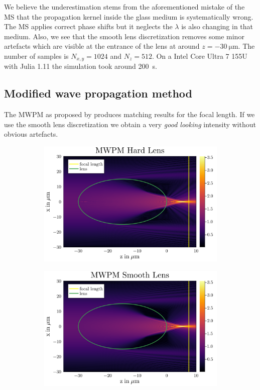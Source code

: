 \documentclass[a4paper,12pt]{article}
\begin{document}
We believe the underestimation stems from the aforementioned mistake of the MS that the propagation kernel inside the glass medium is systematically wrong. The MS applies correct phase shifts but it neglects the $\lambda$ is also changing in that medium.
Also, we see that the smooth lens discretization removes some minor artefacts which are visible at the entrance of the lens at around $z=\SI{-30}{\micro\meter}$.
The number of samples is $N_{x,y} = 1024$ and $N_z=512$. On a Intel Core Ultra 7 155U with Julia 1.11 the simulation took around \SI{200}{\second}.

\subsection{Modified wave propagation method}
The MWPM as proposed by \cite{schmidt2016wave} produces matching results for the focal length. If we use the smooth lens discretization we obtain a very \textit{good looking} intensity without obvious artefacts.
\begin{figure}[H]
    \centering
    \begin{subfigure}[]{0.5\textwidth}
        \centering
        \includegraphics[width=\textwidth]{../figures/MWPM_hard.svg.png} 
    \end{subfigure}%
    \begin{subfigure}[]{0.5\textwidth}
        \centering
        \includegraphics[width=\textwidth]{../figures/MWPM_soft.svg.png} 
    \end{subfigure}
    \caption{}
    \label{fig:}
\end{figure}
\end{document}
